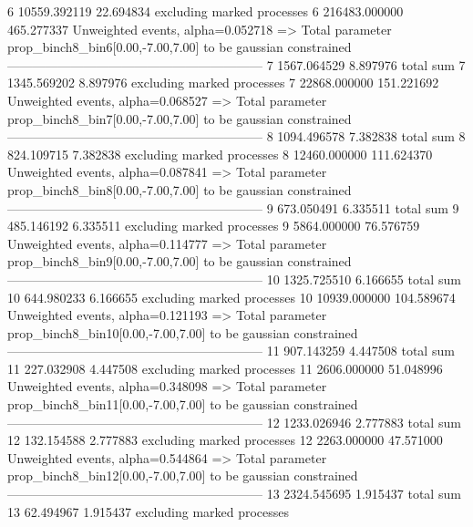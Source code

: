 6          10559.392119    22.694834       excluding marked processes    
6          216483.000000   465.277337      Unweighted events, alpha=0.052718
  => Total parameter prop_binch8_bin6[0.00,-7.00,7.00] to be gaussian constrained
------------------------------------------------------------
7          1567.064529     8.897976        total sum                     
7          1345.569202     8.897976        excluding marked processes    
7          22868.000000    151.221692      Unweighted events, alpha=0.068527
  => Total parameter prop_binch8_bin7[0.00,-7.00,7.00] to be gaussian constrained
------------------------------------------------------------
8          1094.496578     7.382838        total sum                     
8          824.109715      7.382838        excluding marked processes    
8          12460.000000    111.624370      Unweighted events, alpha=0.087841
  => Total parameter prop_binch8_bin8[0.00,-7.00,7.00] to be gaussian constrained
------------------------------------------------------------
9          673.050491      6.335511        total sum                     
9          485.146192      6.335511        excluding marked processes    
9          5864.000000     76.576759       Unweighted events, alpha=0.114777
  => Total parameter prop_binch8_bin9[0.00,-7.00,7.00] to be gaussian constrained
------------------------------------------------------------
10         1325.725510     6.166655        total sum                     
10         644.980233      6.166655        excluding marked processes    
10         10939.000000    104.589674      Unweighted events, alpha=0.121193
  => Total parameter prop_binch8_bin10[0.00,-7.00,7.00] to be gaussian constrained
------------------------------------------------------------
11         907.143259      4.447508        total sum                     
11         227.032908      4.447508        excluding marked processes    
11         2606.000000     51.048996       Unweighted events, alpha=0.348098
  => Total parameter prop_binch8_bin11[0.00,-7.00,7.00] to be gaussian constrained
------------------------------------------------------------
12         1233.026946     2.777883        total sum                     
12         132.154588      2.777883        excluding marked processes    
12         2263.000000     47.571000       Unweighted events, alpha=0.544864
  => Total parameter prop_binch8_bin12[0.00,-7.00,7.00] to be gaussian constrained
------------------------------------------------------------
13         2324.545695     1.915437        total sum                     
13         62.494967       1.915437        excluding marked processes    
